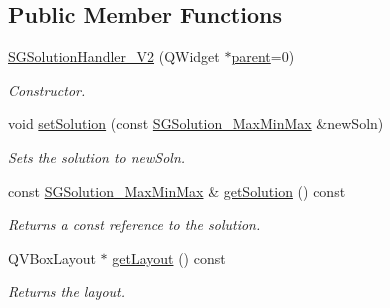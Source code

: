 \subsection*{Public Member Functions}
\begin{DoxyCompactItemize}
\item 
\hyperlink{classSGSolutionHandler__V2_ac7cdb688062432d9f103485689908d01}{S\+G\+Solution\+Handler\+\_\+\+V2} (Q\+Widget $\ast$\hyperlink{classSGSolutionHandler__V2_aff9b574fe2cfb263a9328baebd0744f1}{parent}=0)
\begin{DoxyCompactList}\small\item\em Constructor. \end{DoxyCompactList}\item 
\mbox{\label{classSGSolutionHandler__V2_af0f06fca4b45dfbb4309319a90165d14}} 
void \hyperlink{classSGSolutionHandler__V2_af0f06fca4b45dfbb4309319a90165d14}{set\+Solution} (const \hyperlink{classSGSolution__MaxMinMax}{S\+G\+Solution\+\_\+\+Max\+Min\+Max} \&new\+Soln)
\begin{DoxyCompactList}\small\item\em Sets the solution to new\+Soln. \end{DoxyCompactList}\item 
\mbox{\label{classSGSolutionHandler__V2_a2d5416d2104a58d498af9043dd2ef6e2}} 
const \hyperlink{classSGSolution__MaxMinMax}{S\+G\+Solution\+\_\+\+Max\+Min\+Max} \& \hyperlink{classSGSolutionHandler__V2_a2d5416d2104a58d498af9043dd2ef6e2}{get\+Solution} () const
\begin{DoxyCompactList}\small\item\em Returns a const reference to the solution. \end{DoxyCompactList}\item 
\mbox{\label{classSGSolutionHandler__V2_a0e1eb747c6bbb9ff359c7524737e67bb}} 
Q\+V\+Box\+Layout $\ast$ \hyperlink{classSGSolutionHandler__V2_a0e1eb747c6bbb9ff359c7524737e67bb}{get\+Layout} () const
\begin{DoxyCompactList}\small\item\em Returns the layout. \end{DoxyCompactList}\item 
\mbox{\label{classSGSolutionHandler__V2_a808ac079b5e4fa60f90d8f2a74ee7606}} 

\end{DoxyCompactItemize}
